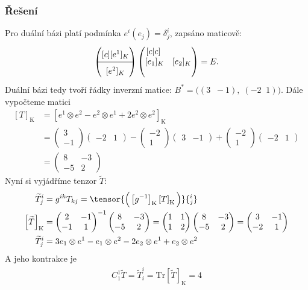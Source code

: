 \documentclass[]{article}
\newcommand{\kanon}[1]{\ensuremath{\left[#1\right]_\mathrm{K}}}
\newcommand{\mat}[1]{\begin{pmatrix}#1\end{pmatrix}}
\begin{document}
\subsubsection{Řešení}
Pro duální bázi platí podmínka $e^i(e_j) = \delta^i_j$, zapsáno maticově:
\begin{align*}
    \renewcommand{\arraystretch}{1.6}
    \begin{pmatrix}[c]
        [e^1]_K \\ \hline
        [e^2]_K
    \end{pmatrix}
    \renewcommand{\arraystretch}{1}
    \begin{pmatrix}[c|c]
        \; & \;
        \\
        [e_1]_K &
        [e_2]_K
        \\
        \; & \;
    \end{pmatrix}
    = E.
\end{align*}
Duální bázi tedy tvoří řádky inverzní matice: $B^* = \Big((3 \;\; -1),\; (-2 \;\; 1)\Big)$. Dále vypočteme matici
\begin{align*}
    \kanon{T}
    &= \kanon{e^1 \otimes e^2 - e^2  \otimes e^1 + 2e^2 \otimes e^2} \\
    &= \mat{3\\-1} \mat{-2&1} - \mat{-2\\1} \mat{3&-1} + \mat{-2\\1} \mat{-2&1} \\
    &= \mat{8 & -3 \\ -5 & 2}
\end{align*}
Nyní si vyjádříme tenzor $\widetilde{T}$:
\begin{align*}
    \widetilde{T}^i_j &= g^{ik} T_{kj} = \tensor{\Big( \kanon{g^{-1}} \kanon{T} \Big)}{^i_j} \\
    \kanon{\widetilde{T}} &=
    \mat{2 & -1 \\ -1 & 1}^{-1}
    \mat{8 & -3 \\ -5 & 2} =
    \mat{1 & 1 \\ 1 & 2}
    \mat{8 & -3 \\ -5 & 2} =
    \mat{3 & -1 \\ -2 & 1} \\
    \widetilde{T}^i_j &= 3 e_1 \otimes e^1 - e_1 \otimes e^2 -2 e_2 \otimes e^1 + e_2 \otimes e^2
\end{align*}
A jeho kontrakce je
\begin{align*}
    C^1_1 \widetilde{T} = \widetilde{T}^i_i = \mathrm{Tr} \kanon{\widetilde{T}} = 4
\end{align*}
\end{document}
